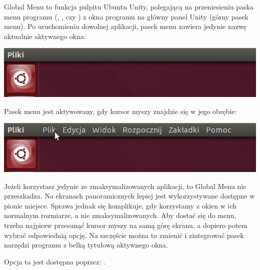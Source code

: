 Global Menu to funkcja pulpitu Ubuntu Unity, polegającą na przeniesieniu paska menu programu (, , czy ) z okna programu na główny panel Unity (górny pasek menu). Po uruchomieniu dowolnej aplikacji, pasek menu zawiera jedynie nazwę aktualnie aktywnego okna:

\begin{center}
	\includegraphics[width=\linewidth]{images/unity_menu_bar2.png}
\end{center}

Pasek menu jest aktywowany, gdy kursor myszy znajdzie się w jego obrębie:

\begin{center}
	\includegraphics[width=\linewidth]{images/unity_menu_bar3.png}
\end{center}

Jeżeli korzystasz jedynie ze zmaksymalizowanych aplikacji, to Global Menu nie przeszkadza. Na ekranach panoramicznych lepiej jest wykorzystywane dostępne w pionie miejsce. Sprawa jednak się komplikuje, gdy korzystamy z okien w ich normalnym rozmiarze, a nie zmaksymalizowanych. Aby dostać się do menu, trzeba najpierw przesunąć kursor myszy na samą górę ekranu, a dopiero potem wybrać odpowiednią opcję. Na szczęście można to zmienić i zintegrować pasek narzędzi programu z belką tytułową aktywnego okna. 

Opcja ta jest dostępna poprzez:
\noindent {}.
